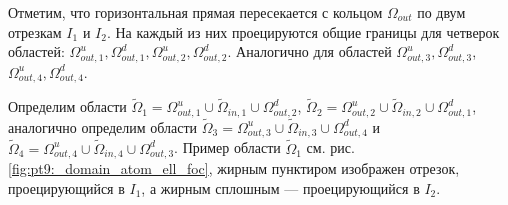 Отметим, что горизонтальная прямая пересекается с кольцом $\Omega_{out}$ по двум отрезкам $I_1$ и $I_2$. На каждый из них проецируются общие границы для четверок областей: $\Omega_{out, 1}^u, \Omega_{out, 1}^d, \Omega_{out, 2}^u, \Omega_{out, 2}^d$. Аналогично для областей $\Omega_{out, 3}^u, \Omega_{out, 3}^d$, $ \Omega_{out, 4}^u, \Omega_{out, 4}^d$.

Определим области $\widetilde{\Omega}_1 = \Omega_{out, 1}^u \cup \widetilde{\Omega}_{in, 1} \cup \Omega_{out, 2}^d$, $\widetilde{\Omega}_2 = \Omega_{out, 2}^u \cup \widetilde{\Omega}_{in, 2} \cup \Omega_{out, 1}^d$, аналогично определим области $\widetilde{\Omega}_3 = \Omega_{out, 3}^u \cup \widetilde{\Omega}_{in, 3} \cup \Omega_{out, 4}^d$ и $\widetilde{\Omega}_4 = \Omega_{out, 4}^u \cup \widetilde{\Omega}_{in, 4} \cup \Omega_{out, 3}^d$. Пример области $\widetilde{\Omega}_1$ см. рис. \ref{fig:pt9:_domain_atom_ell_foc},  жирным пунктиром  изображен отрезок, проецирующийся в  $I_1$, а жирным сплошным --- проецирующийся в $I_2$.

